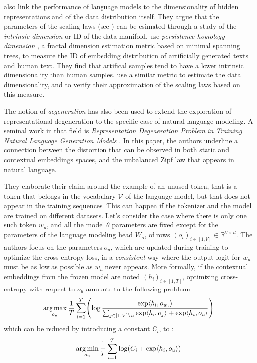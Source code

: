 \citet{scaling_manifold} also link the performance of language models to the dimensionality of hidden representations and of the data distribution itself. They argue that the parameters of the scaling laws (see ) can be esimated through a study of the \textit{intrinsic dimension} or ID \citep{intrinsic_d} of the data manifold. \citet{intrinsic_d} use \textit{persistence homology dimension} \citep{phdim}, a fractal dimension estimation metric based on minimal spanning trees, to measure the ID of embedding distribution of artificially generated texts and human text. They find that artifical samples tend to have a lower intrinsic dimensionality than human samples. \citet{scaling_manifold} use a similar metric to estimate the data dimensionality, and to verify their approximation of the scaling laws based on this measure.


The notion of \textit{degeneration} has also been used to extend the exploration of representational degeneration to the specific case of natural language modeling. A seminal work in that field is \textit{Representation Degeneration Problem in Training Natural Language Generation Models} \citep{gao2018representation}. In this paper, the authors underline a connection between the distortion that can be observed in both static and contextual embeddings spaces, and the unbalanced Zipf law that appears in natural language.

They elaborate their claim around the example of an unused token, that is a token that belongs in the vocabulary $\mathcal{V}$ of the language model, but that does not appear in the training sequences. This can happen if the tokenizer and the model are trained on different datasets. Let's consider the case where there is only one such token $w_u$, and all the model $\theta$ parameters are fixed except for the parameters of the language modeling head $W_o$, of rows $(o_i)_{i\in[1, V]} \in \mathbb{R}^{V \times d}$. The authors focus on the parameters $o_u$, which are updated during training to optimize the cross-entropy loss, in a \textit{consistent} way where the output logit for $w_u$ must be as low as possible as $w_u$ never appears. More formally, if the contextual embeddings from the frozen model are noted $(h_i)_{i \in [1, T]}$, optimizing cross-entropy with respect to $o_u$ amounts to the following problem:
$$
\argmax_{o_u} \frac{1}{T} \sum_{i=1}^{T}\left(\log \frac{\exp \langle h_i, o_{w_i} \rangle}{\sum_{j\in[1, V] \setminus u} \exp \langle h_i, o_{j} \rangle  + \exp \langle h_i, o_u \rangle}\right)
$$
which can be reduced by introducing a constant $C_i$, to :
\begin{equation}
    \label{eq:min_unused}
    \argmin_{o_u} \frac{1}{T} \sum_{i=1}^{T}\log \left(C_i  + \exp \langle h_i, o_u \rangle\right)
\end{equation}


